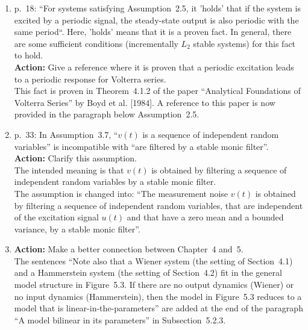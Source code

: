 \documentclass{article}
\newenvironment{answer}{\noindent\ignorespaces\color{blue}}{\noindent\ignorespacesafterend}
\newcommand{\ans}[1]{\begin{answer}#1\end{answer}}
\newcommand{\action}[1]{\textbf{Action:} #1}
\newcommand{\oldnewpage}[2]{\marginpar{{\color{black}#1} / {\color{red}#2}}}
\begin{document}
\begin{enumerate}
	\item p.~18: ``For systems satisfying Assumption~2.5, it 'holds' that if the system is excited by a periodic signal, the steady-state output is also periodic with the same period``. Here, 'holds' means that it is a proven fact. In general, there are some sufficient conditions (incrementally $L_2$ stable systems) for this fact to hold.\\
		\action{Give a reference where it is proven that a periodic excitation leads to a periodic response for Volterra series.}\\
		\ans{\oldnewpage{18}{20}This fact is proven in Theorem~4.1.2 of the paper ``Analytical Foundations of Volterra Series'' by Boyd et al. [1984]. A reference to this paper is now provided in the paragraph below Assumption~2.5.}

	\item \label{item: filtered output noise}
		p.~33: In Assumption~3.7, ``$v(t)$ is a sequence of independent random variables'' is incompatible with ``are filtered by a stable monic filter''.\\
		\action{Clarify this assumption.}\\
		\ans{The intended meaning is that $v(t)$ is obtained by filtering a sequence of independent random variables by a stable monic filter.\\
			\oldnewpage{33}{37}The assumption is changed into: ``The measurement noise $v(t)$ is obtained by filtering a sequence of independent random variables, that are independent of the excitation signal $u(t)$ and that have a zero mean and a bounded variance, by a stable monic filter''.}

	\item \action{Make a better connection between Chapter~4 and~5.}\\
		\ans{\oldnewpage{94--95}{99}The sentences ``Note also that a Wiener system (the setting of Section~4.1) and a Hammerstein system (the setting of Section~4.2) fit in the general model structure in Figure~5.3. If there are no output dynamics (Wiener) or no input dynamics (Hammerstein), then the model in Figure~5.3 reduces to a model that is linear-in-the-parameters'' are added at the end of the paragraph ``A model bilinear in its parameters'' in Subsection~5.2.3.}


\end{enumerate}
\end{document}
